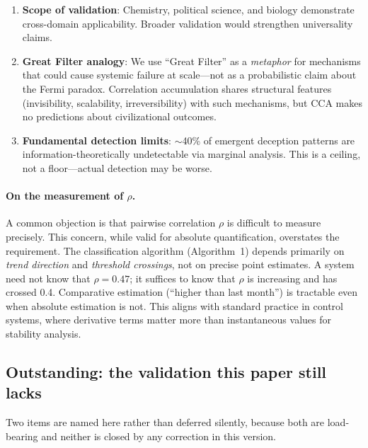 \documentclass[11pt,a4paper]{article}
\theoremstyle{definition}
\theoremstyle{remark}
\begin{document}
\begin{enumerate}
    \item \textbf{Scope of validation}: Chemistry, political science, and biology demonstrate cross-domain applicability. Broader validation would strengthen universality claims.

    \item \textbf{Great Filter analogy}: We use ``Great Filter'' as a \textit{metaphor} for mechanisms that could cause systemic failure at scale---not as a probabilistic claim about the Fermi paradox. Correlation accumulation shares structural features (invisibility, scalability, irreversibility) with such mechanisms, but CCA makes no predictions about civilizational outcomes.

    \item \textbf{Fundamental detection limits}: $\sim$40\% of emergent deception patterns are information-theoretically undetectable via marginal analysis. This is a ceiling, not a floor---actual detection may be worse.
\end{enumerate}

\paragraph{On the measurement of $\rho$.}
A common objection is that pairwise correlation $\rho$ is difficult to measure precisely. This concern, while valid for absolute quantification, overstates the requirement. The classification algorithm (Algorithm~1) depends primarily on \textit{trend direction} and \textit{threshold crossings}, not on precise point estimates. A system need not know that $\rho = 0.47$; it suffices to know that $\rho$ is increasing and has crossed 0.4. Comparative estimation (``higher than last month'') is tractable even when absolute estimation is not. This aligns with standard practice in control systems, where derivative terms matter more than instantaneous values for stability analysis.

\subsection{Outstanding: the validation this paper still lacks}
\label{sec:outstanding-validation}

Two items are named here rather than deferred silently, because both are load-bearing and
neither is closed by any correction in this version.
\end{document}
